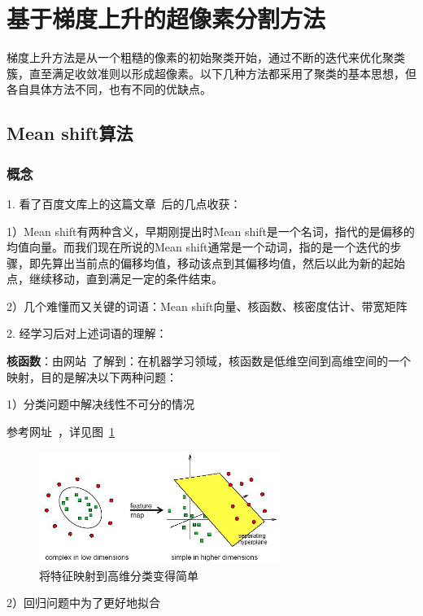 \documentclass[12pt]{article}
\begin{document}
\section{基于梯度上升的超像素分割方法}

梯度上升方法是从一个粗糙的像素的初始聚类开始，通过不断的迭代来优化聚类簇，直至满足收敛准则以形成超像素。以下几种方法都采用了聚类的基本思想，但各自具体方法不同，也有不同的优缺点。

\subsection{Mean shift算法}

\subsubsection{概念}

1. 看了百度文库上的这篇文章~\cite{MeanShiftIntroduction}后的几点收获：

1）Mean shift有两种含义，早期刚提出时Mean shift是一个名词，指代的是偏移的均值向量。而我们现在所说的Mean shift通常是一个动词，指的是一个迭代的步骤，即先算出当前点的偏移均值，移动该点到其偏移均值，然后以此为新的起始点，继续移动，直到满足一定的条件结束。

2）几个难懂而又关键的词语：Mean shift向量、核函数、核密度估计、带宽矩阵

2. 经学习后对上述词语的理解： 

\textbf{核函数}：由网站~\cite{KernelFunction}了解到：在机器学习领域，核函数是低维空间到高维空间的一个映射，目的是解决以下两种问题：

1）分类问题中解决线性不可分的情况

参考网址~\cite{KernelExample}，详见图~\ref{fig: kernel}

\begin{figure}[!ht]
\centering
\includegraphics[width=0.7\textwidth]{kernel.png}
\caption{将特征映射到高维分类变得简单}
\label{fig: kernel}
\end{figure} 

2）回归问题中为了更好地拟合
\end{document}
